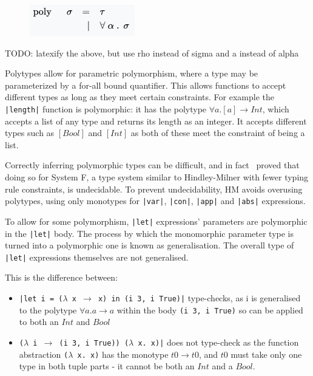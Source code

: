 \documentclass[a4paper,fleqn,twoside,12pt]{report}
\begin{document}
\begin{figure}[h!]
  \centering
  \includegraphics[width=0.290\linewidth]{images/image30.png}
\end{figure}

TODO: latexify the above, but use rho instead of sigma and a instead of alpha

Polytypes allow for parametric polymorphism, where a type may be parameterized by a for-all bound quantifier. This allows functions to accept different types as long as they meet certain constraints. For example the \texttt{|length|} function is polymorphic: it has the polytype $\forall a. [a] \rightarrow Int$, which accepts a list of any type and returns its length as an integer. It accepts different types such as $[Bool]$ and $[Int]$ as both of these meet the constraint of being a list.

Correctly inferring polymorphic types can be difficult, and in fact~\cite{ref14} proved that doing so for System F, a type system similar to Hindley-Milner with fewer typing rule constraints, is undecidable. To prevent undecidability, HM avoids overusing polytypes, using only monotypes for \texttt{|var|}, \texttt{|con|}, \texttt{|app|} and \texttt{|abs|} expressions.

To allow for some polymorphism, \texttt{|let|} expressions’ parameters are polymorphic in the \texttt{|let|} body. The process by which the monomorphic parameter type is turned into a polymorphic one is known as generalisation. The overall type of \texttt{|let|} expressions themselves are not generalised.

This is the difference between:
\begin{itemize}
  \item \texttt{|let i = ($\lambda$ x $\rightarrow$ x) in (i 3, i True)|} type-checks, as i is generalised to the polytype $\forall a. a \rightarrow a$ within the body \texttt{(i 3, i True)} so can be applied to both an $Int$ and $Bool$
  \item \texttt{($\lambda$ i $\rightarrow$ (i 3, i True)) ($\lambda$ x. x)|} does not type-check as the function abstraction \texttt{($\lambda$ x. x)} has the monotype $t0 \rightarrow t0$, and $t0$ must take only one type in both tuple parts - it cannot be both an $Int$ and a $Bool$.
\end{itemize}
\end{document}
